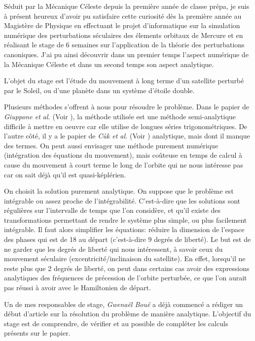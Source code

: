 \documentclass[a4paper]{article}
\begin{document}
\large{
S\'eduit par la M\'ecanique C\'eleste depuis la premi\`ere ann\'ee de classe pr\'epa, je suis \`a pr\'esent heureux d'avoir pu satisfaire cette curiosit\'e d\`es la premi\`ere ann\'ee au Magist\`ere de Physique en effectuant le projet d'informatique sur la simulation num\'erique des perturbations s\'eculaires des \'elements orbitaux de Mercure et en r\'ealisant le stage de 6 semaines sur l'application de la th\'eorie des perturbations canoniques. J'ai pu ainsi d\'ecouvrir dans un premier temps l'aspect num\'erique de la M\'ecanique C\'eleste et dans un second temps son aspect analytique.

L'objet du stage est l'\'etude du mouvement \`a long terme d'un satellite perturb\'e par le Soleil, ou d'une plan\`ete dans un syst\`eme d'\'etoile double.

Plusieurs m\'ethodes s'offrent \`a nous pour r\'esoudre le probl\`eme.
Dans le papier de \textit{Giuppone et al.} (Voir \cite{giuppone}), la m\'ethode utilis\'ee est une m\'ethode semi-analytique difficile \`a mettre en oeuvre car elle utilise de longues s\'eries trigonom\'etriques. De l'autre c\^ot\'e, il y a le papier de \textit{C\`uk et al.} (Voir \cite{cuk}) analytique, mais dont il manque des termes. On peut aussi envisager une m\'ethode purement num\'erique (int\'egration des \'equations du mouvement), mais co\^uteuse en temps de calcul \`a cause du mouvement \`a court terme le long de l'orbite qui ne nous int\'eresse pas car on sait d\'ej\`a qu'il est quasi-k\'epl\'erien.

On choisit la solution purement analytique. On suppose que le probl\`eme est int\'egrable ou assez proche de l'int\'egrabilit\'e. C'est-\`a-dire que les solutions sont r\'eguli\`eres sur l'intervalle de temps que l'on consid\`ere, et qu'il existe des transformations permettant de rendre le syst\`eme plus simple, ou plus facilement int\'egrable. Il faut alors simplifier les \'equations: r\'eduire la dimension de l'espace des phases qui est de 18 au d\'epart (c'est-\`a-dire 9 degr\'es de libert\'e). Le but est de ne garder que les degr\'es de libert\'e qui nous int\'eressent, \`a savoir ceux du mouvement s\'eculaire (excentricit\'e/inclinaison du satellite). En effet, lorsqu'il ne reste plus que 2 degr\'es de libert\'e, on peut dans certains cas avoir des expressions analytiques des fr\'equences de pr\'ecession de l'orbite perturb\'ee, ce que l'on aurait pas r\'eussi \`a avoir avec le Hamiltonien de d\'epart.

Un de mes responsables de stage, \textit{Gwena\"el Bou\'e} a d\'ej\`a commenc\'e a r\'ediger un d\'ebut d'article sur la r\'esolution du probl\`eme de mani\`ere analytique. L'objectif du stage est de comprendre, de v\'erifier et au possible de compl\'eter les calculs pr\'esents sur le papier.

}
\end{document}
